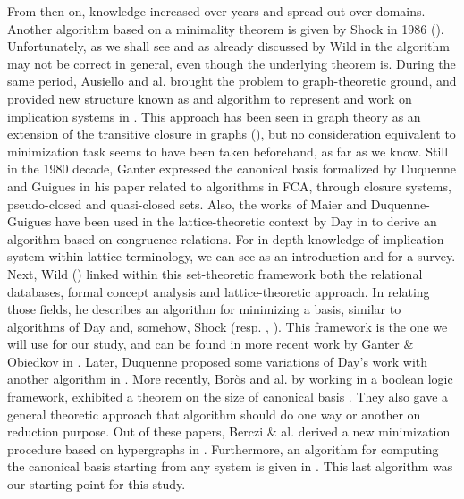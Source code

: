 \vspace{1.2em}

From then on, knowledge increased over years and spread out over domains. 
Another algorithm based on a minimality theorem is given by Shock in 1986 
(\cite{shock_computing_1986}). Unfortunately, as we shall see and as already 
discussed by Wild in \cite{wild_computations_1995} the algorithm may not be
correct in general, even though the underlying theorem is. During the same 
period, Ausiello and al. brought the problem to graph-theoretic ground, and 
provided new structure known as  and algorithm to represent 
and work on implication systems in \cite{ausiello_directed_2017, 
	ausiello_graph_1983, ausiello_minimal_1986}. This approach has been seen in 
graph theory as an extension of the transitive closure in graphs 
(\cite{aho_transitive_2006}), but no consideration equivalent to minimization 
task seems to have been taken beforehand, as far as we know. Still in the 1980 
decade, Ganter expressed the canonical basis formalized by Duquenne and Guigues 
in his paper related to algorithms in FCA, \cite{ganter_two_2010} through 
closure systems, pseudo-closed and quasi-closed sets. Also, the works of Maier and Duquenne-Guigues have been used in the lattice-theoretic context by Day in 
\cite{day_lattice_1992} to derive an algorithm based on congruence relations. 
For in-depth knowledge of implication system within lattice terminology, we can 
see \cite{davey_introduction_2002} as an introduction and 
\cite{bertet_lattices_2016} for a survey. Next, Wild  (\cite{wild_implicational_1989, wild_theory_1994, wild_computations_1995}) 
linked within this set-theoretic framework both the relational databases, 
formal concept analysis and lattice-theoretic approach. In relating those 
fields, he describes an algorithm for minimizing a basis, similar to algorithms 
of Day and, somehow, Shock (resp. \cite{day_lattice_1992},  
\cite{shock_computing_1986}). This framework is the one we will use for our 
study, and can be found in more recent work by Ganter \& Obiedkov in 
\cite{b._ganter_conceptual_2016}. Later, Duquenne proposed some 
variations of Day's work with another algorithm in 
\cite{duquenne_variations_2007}. More recently, Bor\`os and al. by 
working in a boolean logic framework, exhibited a theorem on the size of
canonical basis \cite{boros_exclusive_2010, boros_strong_2017}. They also gave
a general theoretic approach that algorithm should do one way or another on
reduction purpose. Out of these papers, Berczi \& al. derived a new 
minimization procedure based on hypergraphs in \cite{berczi_directed_2017}. 
Furthermore, an algorithm for computing the canonical basis starting from any 
system is given in \cite{b._ganter_conceptual_2016}. This last algorithm was our starting point for this study.

